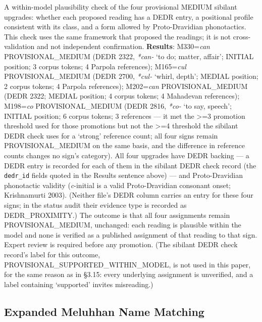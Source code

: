\documentclass[11pt]{article}
\newcounter{none} %
\begin{document}
A within-model plausibility check of the four provisional MEDIUM sibilant upgrades: whether each proposed reading has a DEDR entry, a positional profile consistent with its class, and a form allowed by Proto-Dravidian phonotactics. This check uses the same framework that proposed the readings; it is not cross-validation and not independent confirmation. \textbf{Results}:
M330=\emph{can} PROVISIONAL\_MEDIUM (DEDR 2322, \emph{*can-} `to do; matter, affair'; INITIAL position; 3 corpus tokens; 4 Parpola references); M165=\emph{cul} PROVISIONAL\_MEDIUM (DEDR 2700, \emph{*cul-} `whirl, depth'; MEDIAL position; 2 corpus tokens; 4 Parpola references); M202=\emph{can} PROVISIONAL\_MEDIUM (DEDR 2322; MEDIAL position; 4 corpus tokens; 4 Mahadevan references); M198=\emph{co} PROVISIONAL\_MEDIUM (DEDR 2816, \emph{*co-} `to say, speech'; INITIAL position; 6 corpus tokens; 3 references --- it met the \textgreater{}=3 promotion threshold used for those promotions but not the \textgreater{}=4 threshold the sibilant DEDR check uses for a `strong' reference count; all four signs remain PROVISIONAL\_MEDIUM on the same basis, and the difference in reference counts changes no sign's category). All four upgrades have DEDR backing --- a DEDR entry is recorded for each of them in the sibilant DEDR check record (the \texttt{dedr\_id} fields quoted in the Results sentence above) --- and Proto-Dravidian phonotactic validity (\emph{c}-initial is a valid Proto-Dravidian consonant onset; Krishnamurti 2003). (Neither file's DEDR column carries an entry for these four signs; in the status audit their evidence type is recorded as DEDR\_PROXIMITY.) The outcome is that all four assignments remain PROVISIONAL\_MEDIUM, unchanged: each reading is plausible within the model and none is verified as a published assignment of that reading to that sign. Expert review is required before any promotion. (The sibilant DEDR check record's label for this outcome, PROVISIONAL\_SUPPORTED\_WITHIN\_MODEL, is not used in this paper, for the same reason as in §3.15: every underlying assignment is unverified, and a label containing `supported' invites misreading.)

\subsection{Expanded Meluhhan Name Matching
}\label{expanded-meluhhan-name-matching-phase-167}
\end{document}
